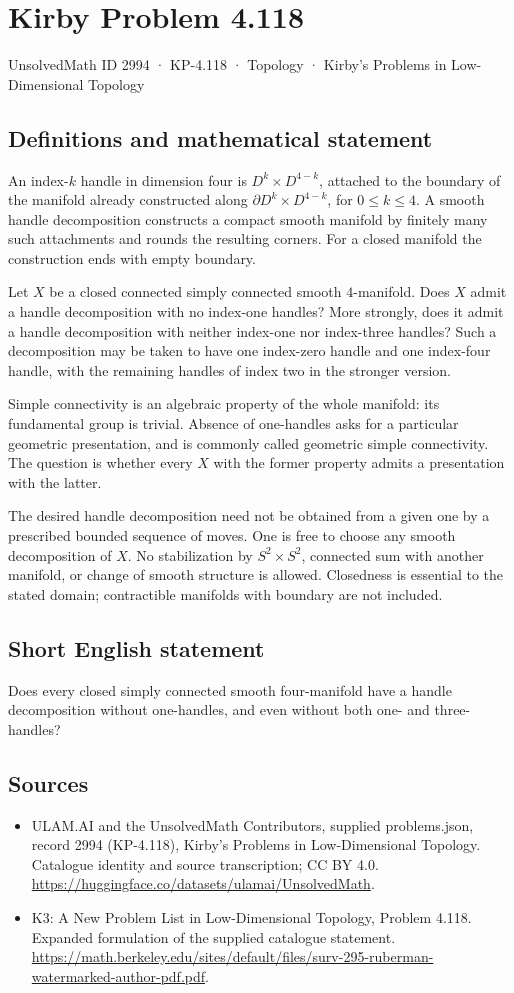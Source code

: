 \documentclass[11pt,a4paper]{article}
\begin{document}
\section*{Kirby Problem 4.118}\label{2994}
{\small UnsolvedMath ID 2994 · KP-4.118 · Topology · Kirby's Problems in Low-Dimensional Topology}
\subsection{Definitions and mathematical statement}
An index-$k$ handle in dimension four is $D^k\times D^{4-k}$,
attached to the boundary of the manifold already constructed along
$\partial D^k\times D^{4-k}$, for $0\le k\le4$.
A smooth handle decomposition constructs a compact smooth manifold
by finitely many such attachments and rounds the resulting corners.
For a closed manifold the construction ends with empty boundary.

Let $X$ be a closed connected simply connected smooth
$4$-manifold. Does $X$ admit a handle decomposition with no
index-one handles? More strongly, does it admit a handle
decomposition with neither index-one nor index-three handles?
Such a decomposition may be taken to have one index-zero handle
and one index-four handle, with the remaining handles of index two
in the stronger version.

Simple connectivity is an algebraic property of the whole manifold:
its fundamental group is trivial. Absence of one-handles asks for
a particular geometric presentation, and is commonly called geometric
simple connectivity. The question is whether every $X$ with the
former property admits a presentation with the latter.

The desired handle decomposition need not be obtained from a given
one by a prescribed bounded sequence of moves. One is free to
choose any smooth decomposition of $X$. No stabilization by
$S^2\times S^2$, connected sum with another manifold, or change
of smooth structure is allowed. Closedness is essential to the
stated domain; contractible manifolds with boundary are not included.
\subsection{Short English statement}
Does every closed simply connected smooth four-manifold have a handle decomposition without one-handles, and even without both one- and three-handles?
\subsection{Sources}
\begin{itemize}
\item[S1] ULAM.AI and the UnsolvedMath Contributors, supplied problems.json, record 2994 (KP-4.118), Kirby's Problems in Low-Dimensional Topology. Catalogue identity and source transcription; CC BY 4.0.
\url{https://huggingface.co/datasets/ulamai/UnsolvedMath}.
\item[S2] K3: A New Problem List in Low-Dimensional Topology, Problem 4.118. Expanded formulation of the supplied catalogue statement.
\url{https://math.berkeley.edu/sites/default/files/surv-295-ruberman-watermarked-author-pdf.pdf}.
\end{itemize}
\end{document}
